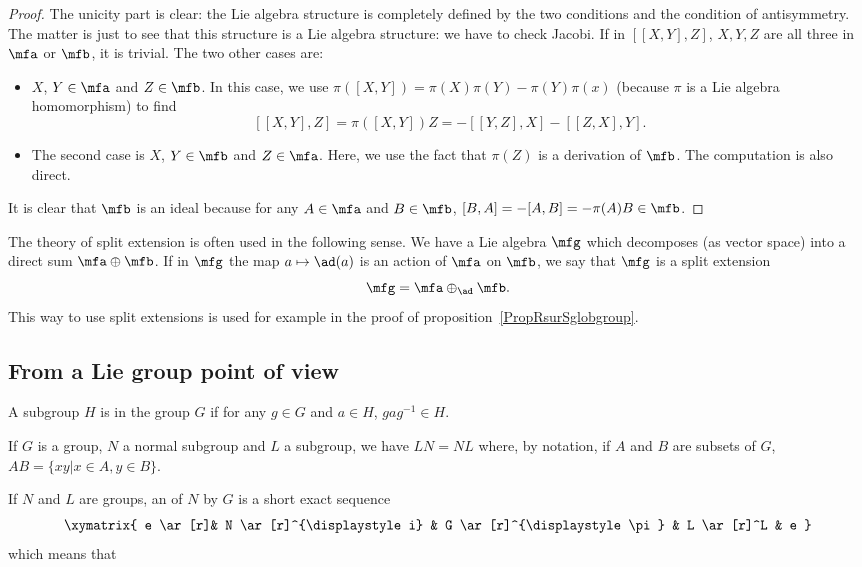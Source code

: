 \begin{proof}
    The unicity part is clear: the Lie algebra structure is completely defined by the two conditions and the condition of antisymmetry. The matter is just to see that this structure is a Lie algebra structure: we have to check Jacobi. If in $[[X,Y],Z]$, $X,Y,Z$ are all three in $\mfa$ or $\mfb$, it is trivial. The two other cases are:
    \begin{itemize}
    \item $X$, $Y\in\mfa$ and $Z\in\mfb$. In this case, we use $\pi([X,Y])=\pi(X)\pi(Y)-\pi(Y)\pi(x)$ (because $\pi$ is a Lie algebra homomorphism) to find
    \[
    [[X,Y],Z]=\pi([X,Y])Z=-[[Y,Z],X]-[[Z,X],Y].
    \]

    \item The second case is $X$, $Y\in\mfb$ and $Z\in\mfa$. Here, we use the fact that $\pi(Z)$ is a derivation of $\mfb$. The computation is also direct.
    \end{itemize}

    It is clear that $\mfb$ is an ideal because for any $A\in\mfa$ and $B\in\mfb$, $[B,A]=-[A,B]=-\pi(A)B\in\mfb$.

\end{proof}

The theory of split extension is often used in the following sense. We have a Lie algebra $\mfg$ which decomposes (as vector space) into a direct sum $\mfa\oplus\mfb$. If in $\mfg$ the map $a\mapsto \ad(a)$ is an action of $\mfa$ on $\mfb$, we say that $\mfg$ is a split extension
\[
  \mfg=\mfa\oplus_{\ad}\mfb.
\]
This way to use split extensions is used for example in the proof of proposition~\ref{PropRsurSglobgroup}.


\subsection{From a Lie group point of view}


\begin{definition}
A subgroup $H$ is  in the group $G$ if for any $g\in G$ and $a\in H$, $gag^{-1}\in H$.
\end{definition}

If $G$ is a group, $N$ a normal subgroup and $L$ a subgroup, we have $LN=NL$ where, by notation, if $A$ and $B$ are subsets of $G$, $AB=\{xy|x\in A,y\in B\}$.

If $N$ and $L$ are groups, an  of $N$ by $G$ is a short exact sequence
\begin{equation}
\xymatrix{ e \ar[r]& N \ar[r]^{\displaystyle i} & G \ar[r]^{\displaystyle \pi} & L \ar[r]^L  & e }
\end{equation}
which means that

